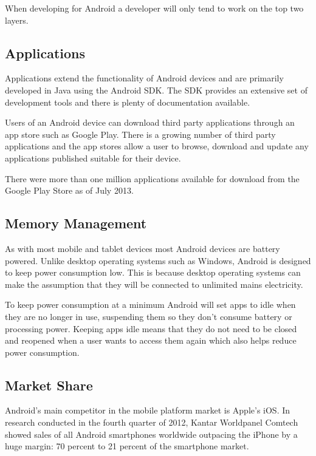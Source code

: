 \documentclass{report}
\begin{document}
When developing for Android a developer will only tend to work on the top two layers.

\subsection{Applications}

Applications extend the functionality of Android devices and are primarily developed in Java using the Android SDK. The SDK provides an extensive set of development tools and there is plenty of documentation available.

Users of an Android device can download third party applications through an app store such as Google Play. There is a growing number of third party applications and the app stores allow a user to browse, download and update any applications published suitable for their device.

There were more than one million applications available for download from the Google Play Store as of July 2013\cite{appstoredownloads}. 

\subsection{Memory Management}

As with most mobile and tablet devices most Android devices are battery powered. Unlike desktop operating systems such as Windows, Android is designed to keep power consumption low. This is because desktop operating systems can make the assumption that they will be connected to unlimited mains electricity. 

To keep power consumption at a minimum Android will set apps to idle when they are no longer in use, suspending them so they don't consume battery or processing power. Keeping apps idle means that they do not need to be closed and reopened when a user wants to access them again which also helps reduce power consumption.

\subsection{Market Share}

Android's main competitor in the mobile platform market is Apple's iOS. In research conducted in the fourth quarter of 2012, Kantar Worldpanel Comtech showed sales of all Android smartphones worldwide outpacing the iPhone by a huge margin: 70 percent to 21 percent of the smartphone market\cite{androidstats}.
\end{document}

